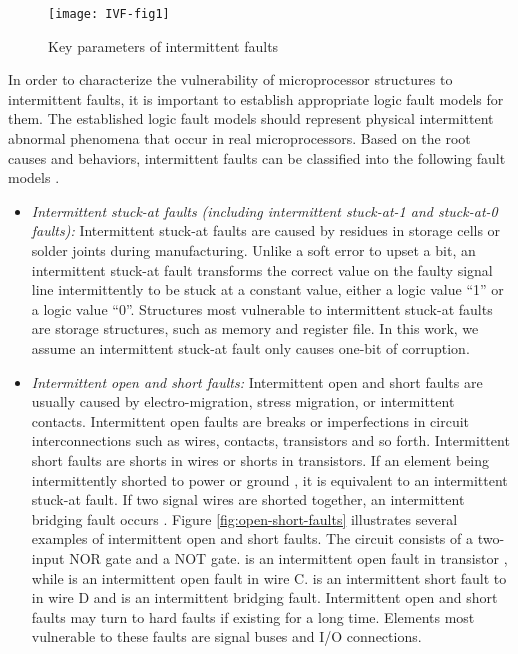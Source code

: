 \begin{figure}[t]
\centering
\texttt{[image: IVF-fig1]}
\caption{Key parameters of intermittent faults}
\label{fig:intermittent-faults} 
\end{figure}

In order to characterize the vulnerability of microprocessor structures to intermittent faults, it is important to establish appropriate logic fault models for them. The established logic fault models should represent physical intermittent abnormal phenomena that occur in real microprocessors. Based on the root causes and behaviors, intermittent faults can be classified into the following fault models \cite{gracia2008analysis} \cite{gil2003study}.

\begin{itemize}
    \item \textit{Intermittent stuck-at faults (including intermittent stuck-at-1 and stuck-at-0 faults):} Intermittent stuck-at faults are caused by residues in storage cells or solder joints during manufacturing. Unlike a soft error to upset a bit, an intermittent stuck-at fault transforms the correct value on the faulty signal line intermittently to be stuck at a constant value, either a logic value “1” or a logic value “0”. Structures most vulnerable to intermittent stuck-at faults are storage structures, such as memory and register file. In this work, we assume an intermittent stuck-at fault only causes one-bit of corruption.

    \item \textit{Intermittent open and short faults:} Intermittent open and short faults are usually caused by electro-migration, stress migration, or intermittent contacts. Intermittent open faults are breaks or imperfections in circuit interconnections such as wires, contacts, transistors and so forth. Intermittent short faults are shorts in wires or shorts in transistors. If an element being intermittently shorted to power or ground , it is equivalent to an intermittent stuck-at fault. If two signal wires are shorted together, an intermittent bridging fault occurs \cite{wang2006vlsi}. Figure \ref{fig:open-short-faults} illustrates several examples of intermittent open and short faults. The circuit consists of a two-input NOR gate and a NOT gate. is an intermittent open fault in transistor , while is an intermittent open fault in wire C. is an intermittent short fault to in wire D and is an intermittent bridging fault. Intermittent open and short faults may turn to hard faults if existing for a long time. Elements most vulnerable to these faults are signal buses and I/O connections.


\end{itemize}
